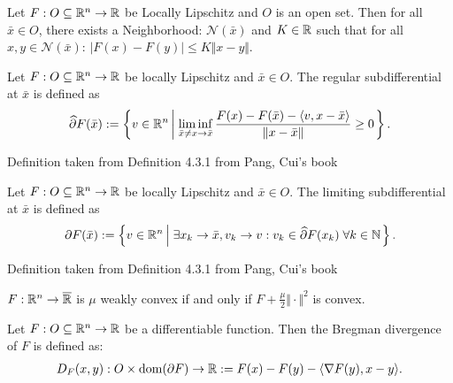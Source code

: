 \documentclass[12pt]{article}
\begin{document}
        \begin{definition}
            Let $F: O \subseteq \mathbb R^n \rightarrow \mathbb R$ be Locally Lipschitz and $O$ is an open set. 
            Then for all $\bar x \in O$, there exists a Neighborhood: $\mathcal N(\bar x)$ and $K \in \mathbb R$ such that for all $x, y \in \mathcal N(\bar x)$: $|F(x) - F(y)| \le K \Vert x - y\Vert$. 
        \end{definition}
        \begin{definition}
            Let $F: O \subseteq \mathbb R^n \rightarrow \mathbb R$ be locally Lipschitz and $\bar x \in O$. 
            The regular subdifferential at $\bar x$ is defined as 
            \begin{align*}
                \widehat \partial F(\bar x) := 
                \left\lbrace
                    v \in \mathbb R^n \left| \; 
                        \liminf_{\bar x \neq x\rightarrow \bar x}
                        \frac{F(x) - F(\bar x) - \langle v, x - \bar x\rangle}{\Vert x - \bar x\Vert} 
                        \ge 0
                    \right.
                \right\rbrace. 
            \end{align*}
        \end{definition}
        \begin{remark}
            Definition taken from Definition 4.3.1 from 
            Pang, Cui's book \cite{ying_modern_2021}
        \end{remark}
        \begin{definition}
            Let $F: O \subseteq \mathbb R^n \rightarrow \mathbb R$ be locally Lipschitz and $\bar x \in O$. 
            The limiting subdifferential at $\bar x$ is defined as 
            \begin{align*}
                \partial F(\bar x) := 
                \left\lbrace
                    v \in \mathbb R^n \left| \; 
                        \exists x_k \rightarrow \bar x, v_k \rightarrow v: 
                        v_k \in \widehat \partial F(x_k) \;\forall k \in \mathbb N
                    \right.
                \right\rbrace. 
            \end{align*}
        \end{definition}
        \begin{remark}
            Definition taken from Definition 4.3.1 from
            Pang, Cui's book \cite{ying_modern_2021}
        \end{remark}
        \begin{definition}
            $F: \mathbb R^n \rightarrow \overline {\mathbb R}$ is $\mu$ weakly convex if and only if $F + \frac{\mu}{2}\Vert \cdot\Vert^2$ is convex. 
        \end{definition}
        \begin{definition}
            Let $F: O \subseteq \mathbb R^n \rightarrow \mathbb R$ be a differentiable function. 
            Then the Bregman divergence of $F$ is defined as: 
            \begin{align*}
                D_F(x, y): O \times \operatorname{dom}(\partial F) \rightarrow \mathbb R
                := F(x) - F(y) - \langle \nabla F(y), x - y\rangle. 
            \end{align*}
        \end{definition}
\end{document}
